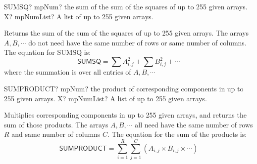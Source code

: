 
\begin{mpFunctionsExtract}
	\mpWorksheetFunctionOneNotImplemented
	{SUMSQ? mpNum? the sum of the sum of the squares of up to 255 given arrays.}
	{X? mpNumList? A list of up to 255 given arrays.}
\end{mpFunctionsExtract}

\vspace{0.3cm}
Returns the sum of the sum of the squares of  up to 255 given arrays. The arrays $A, B, \cdots$ do not need have the same number of rows or same number of columns.
The equation for \textsf{SUMSQ} is:
\begin{equation}
	\textsf{SUMSQ} = \sum A_{i,j}^2 + \sum B_{i,j}^2 + \cdots
\end{equation}
where the summation is over all entries of $A, B, \cdots$ 









\begin{mpFunctionsExtract}
	\mpWorksheetFunctionOneNotImplemented
	{SUMPRODUCT? mpNum? the product of corresponding components in up to 255 given arrays.}
	{X? mpNumList? A list of up to 255 given arrays.}
\end{mpFunctionsExtract}

\vspace{0.3cm}
Multiplies corresponding components in up to 255 given arrays, and returns the sum of those products. The arrays $A, B, \cdots$ all need have the same number of rows $R$ and same number of columns $C$.
The equation for the sum of the products is:
\begin{equation}
	\textsf{SUMPRODUCT} = \sum_{i=1}^R \sum_{j=1}^C \left( A_{i,j} \times B_{i,j} \times \cdots \right)
\end{equation}







